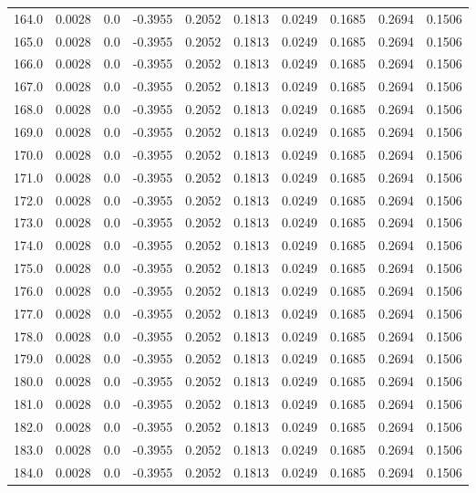 \begin{longtable}{lrrrrrrrrr}
164.0 & 0.0028 & 0.0 & -0.3955 & 0.2052 & 0.1813 & 0.0249 & 0.1685 & 0.2694 & 0.1506 \\
165.0 & 0.0028 & 0.0 & -0.3955 & 0.2052 & 0.1813 & 0.0249 & 0.1685 & 0.2694 & 0.1506 \\
166.0 & 0.0028 & 0.0 & -0.3955 & 0.2052 & 0.1813 & 0.0249 & 0.1685 & 0.2694 & 0.1506 \\
167.0 & 0.0028 & 0.0 & -0.3955 & 0.2052 & 0.1813 & 0.0249 & 0.1685 & 0.2694 & 0.1506 \\
168.0 & 0.0028 & 0.0 & -0.3955 & 0.2052 & 0.1813 & 0.0249 & 0.1685 & 0.2694 & 0.1506 \\
169.0 & 0.0028 & 0.0 & -0.3955 & 0.2052 & 0.1813 & 0.0249 & 0.1685 & 0.2694 & 0.1506 \\
170.0 & 0.0028 & 0.0 & -0.3955 & 0.2052 & 0.1813 & 0.0249 & 0.1685 & 0.2694 & 0.1506 \\
171.0 & 0.0028 & 0.0 & -0.3955 & 0.2052 & 0.1813 & 0.0249 & 0.1685 & 0.2694 & 0.1506 \\
172.0 & 0.0028 & 0.0 & -0.3955 & 0.2052 & 0.1813 & 0.0249 & 0.1685 & 0.2694 & 0.1506 \\
173.0 & 0.0028 & 0.0 & -0.3955 & 0.2052 & 0.1813 & 0.0249 & 0.1685 & 0.2694 & 0.1506 \\
174.0 & 0.0028 & 0.0 & -0.3955 & 0.2052 & 0.1813 & 0.0249 & 0.1685 & 0.2694 & 0.1506 \\
175.0 & 0.0028 & 0.0 & -0.3955 & 0.2052 & 0.1813 & 0.0249 & 0.1685 & 0.2694 & 0.1506 \\
176.0 & 0.0028 & 0.0 & -0.3955 & 0.2052 & 0.1813 & 0.0249 & 0.1685 & 0.2694 & 0.1506 \\
177.0 & 0.0028 & 0.0 & -0.3955 & 0.2052 & 0.1813 & 0.0249 & 0.1685 & 0.2694 & 0.1506 \\
178.0 & 0.0028 & 0.0 & -0.3955 & 0.2052 & 0.1813 & 0.0249 & 0.1685 & 0.2694 & 0.1506 \\
179.0 & 0.0028 & 0.0 & -0.3955 & 0.2052 & 0.1813 & 0.0249 & 0.1685 & 0.2694 & 0.1506 \\
180.0 & 0.0028 & 0.0 & -0.3955 & 0.2052 & 0.1813 & 0.0249 & 0.1685 & 0.2694 & 0.1506 \\
181.0 & 0.0028 & 0.0 & -0.3955 & 0.2052 & 0.1813 & 0.0249 & 0.1685 & 0.2694 & 0.1506 \\
182.0 & 0.0028 & 0.0 & -0.3955 & 0.2052 & 0.1813 & 0.0249 & 0.1685 & 0.2694 & 0.1506 \\
183.0 & 0.0028 & 0.0 & -0.3955 & 0.2052 & 0.1813 & 0.0249 & 0.1685 & 0.2694 & 0.1506 \\
184.0 & 0.0028 & 0.0 & -0.3955 & 0.2052 & 0.1813 & 0.0249 & 0.1685 & 0.2694 & 0.1506 \\

\end{longtable}
